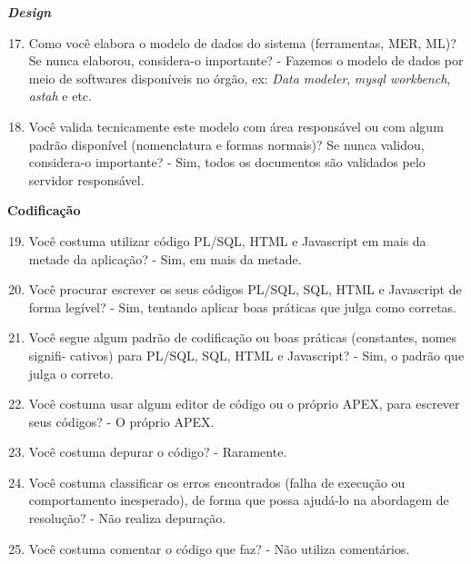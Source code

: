 \begin{apendicesenv}
\textbf{\textit{Design}}

\begin{enumerate}
	\setcounter{enumi}{16}
	\item Como você elabora o modelo de dados do sistema (ferramentas, MER, ML)? Se nunca
	elaborou, considera-o importante?\newline
	- Fazemos o modelo de dados por meio de softwares disponíveis no órgão, ex: \textit{Data modeler}, \textit{mysql workbench}, \textit{astah} e etc.
	\item Você valida tecnicamente este modelo com área responsável ou com algum padrão
	disponível (nomenclatura e formas normais)? Se nunca validou, considera-o importante?\newline
	- Sim, todos os documentos são validados pelo servidor responsável.
\end{enumerate}

\textbf{Codificação}

\begin{enumerate}
	\setcounter{enumi}{18}
	\item Você costuma utilizar código PL/SQL, HTML e Javascript em mais da metade da
	aplicação?\newline
	- Sim, em mais da metade.
	\item Você procurar escrever os seus códigos PL/SQL, SQL, HTML e Javascript de forma
	legível?\newline
	- Sim, tentando aplicar boas práticas que julga como corretas.
	\item Você segue algum padrão de codificação ou boas práticas (constantes, nomes signifi-
	cativos) para PL/SQL, SQL, HTML e Javascript?\newline
	- Sim, o padrão que julga o correto.
	\item Você costuma usar algum editor de código ou o próprio APEX, para escrever seus
	códigos?\newline
	- O próprio APEX.
	\item Você costuma depurar o código?\newline
	- Raramente.
	\item Você costuma classificar os erros encontrados (falha de execução ou comportamento
	inesperado), de forma que possa ajudá-lo na abordagem de resolução?\newline
	- Não realiza depuração.
	\item Você costuma comentar o código que faz?\newline
	- Não utiliza comentários.
\end{enumerate}


\end{apendicesenv}
